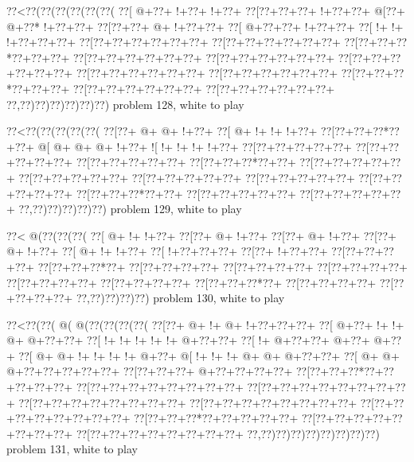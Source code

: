 \vbox{\vbox{\goo
\0??<\0??(\0??(\0??(\0??(\0??(\0??(
\0??[\- @+\0??+\- !+\0??+\- !+\0??+
\0??[\0??+\0??+\0??+\- !+\0??+\0??+
\- @[\0??+\- @+\0??*\- !+\0??+\0??+
\0??[\0??+\0??+\- @+\- !+\0??+\0??+
\0??[\- @+\0??+\0??+\- !+\0??+\0??+
\0??[\- !+\- !+\- !+\0??+\0??+\0??+
\0??[\0??+\0??+\0??+\0??+\0??+\0??+
\0??[\0??+\0??+\0??+\0??+\0??+\0??+
\0??[\0??+\0??+\0??*\0??+\0??+\0??+
\0??[\0??+\0??+\0??+\0??+\0??+\0??+
\0??[\0??+\0??+\0??+\0??+\0??+\0??+
\0??[\0??+\0??+\0??+\0??+\0??+\0??+
\0??[\0??+\0??+\0??+\0??+\0??+\0??+
\0??[\0??+\0??+\0??+\0??+\0??+\0??+
\0??[\0??+\0??+\0??*\0??+\0??+\0??+
\0??[\0??+\0??+\0??+\0??+\0??+\0??+
\0??[\0??+\0??+\0??+\0??+\0??+\0??+
\0??,\0??)\0??)\0??)\0??)\0??)\0??)
}
\hfil problem 128, white to play\hfil\break
}

\vbox{\vbox{\goo
\0??<\0??(\0??(\0??(\0??(\0??(
\0??[\0??+\- @+\- @+\- !+\0??+
\0??[\- @+\- !+\- !+\- !+\0??+
\0??[\0??+\0??+\0??*\0??+\0??+
\- @[\- @+\- @+\- @+\- !+\0??+
\- ![\- !+\- !+\- !+\- !+\0??+
\0??[\0??+\0??+\0??+\0??+\0??+
\0??[\0??+\0??+\0??+\0??+\0??+
\0??[\0??+\0??+\0??+\0??+\0??+
\0??[\0??+\0??+\0??*\0??+\0??+
\0??[\0??+\0??+\0??+\0??+\0??+
\0??[\0??+\0??+\0??+\0??+\0??+
\0??[\0??+\0??+\0??+\0??+\0??+
\0??[\0??+\0??+\0??+\0??+\0??+
\0??[\0??+\0??+\0??+\0??+\0??+
\0??[\0??+\0??+\0??*\0??+\0??+
\0??[\0??+\0??+\0??+\0??+\0??+
\0??[\0??+\0??+\0??+\0??+\0??+
\0??,\0??)\0??)\0??)\0??)\0??)
}
\hfil problem 129, white to play\hfil\break
}

\vbox{\vbox{\goo
\0??<\- @(\0??(\0??(\0??(
\0??[\- @+\- !+\- !+\0??+
\0??[\0??+\- @+\- !+\0??+
\0??[\0??+\- @+\- !+\0??+
\0??[\0??+\- @+\- !+\0??+
\0??[\- @+\- !+\- !+\0??+
\0??[\- !+\0??+\0??+\0??+
\0??[\0??+\- !+\0??+\0??+
\0??[\0??+\0??+\0??+\0??+
\0??[\0??+\0??+\0??*\0??+
\0??[\0??+\0??+\0??+\0??+
\0??[\0??+\0??+\0??+\0??+
\0??[\0??+\0??+\0??+\0??+
\0??[\0??+\0??+\0??+\0??+
\0??[\0??+\0??+\0??+\0??+
\0??[\0??+\0??+\0??*\0??+
\0??[\0??+\0??+\0??+\0??+
\0??[\0??+\0??+\0??+\0??+
\0??,\0??)\0??)\0??)\0??)
}
\hfil problem 130, white to play\hfil\break
}

\vbox{\vbox{\goo
\0??<\0??(\0??(\- @(\- @(\0??(\0??(\0??(\0??(
\0??[\0??+\- @+\- !+\- @+\- !+\0??+\0??+\0??+
\0??[\- @+\0??+\- !+\- !+\- @+\- @+\0??+\0??+
\0??[\- !+\- !+\- !+\- !+\- !+\- @+\0??+\0??+
\0??[\- !+\- @+\0??+\0??+\- @+\0??+\- @+\0??+
\0??[\- @+\- @+\- !+\- !+\- !+\- !+\- @+\0??+
\- @[\- !+\- !+\- !+\- @+\- @+\- @+\0??+\0??+
\0??[\- @+\- @+\- @+\0??+\0??+\0??+\0??+\0??+
\0??[\0??+\0??+\0??+\- @+\0??+\0??+\0??+\0??+
\0??[\0??+\0??+\0??*\0??+\0??+\0??+\0??+\0??+
\0??[\0??+\0??+\0??+\0??+\0??+\0??+\0??+\0??+
\0??[\0??+\0??+\0??+\0??+\0??+\0??+\0??+\0??+
\0??[\0??+\0??+\0??+\0??+\0??+\0??+\0??+\0??+
\0??[\0??+\0??+\0??+\0??+\0??+\0??+\0??+\0??+
\0??[\0??+\0??+\0??+\0??+\0??+\0??+\0??+\0??+
\0??[\0??+\0??+\0??*\0??+\0??+\0??+\0??+\0??+
\0??[\0??+\0??+\0??+\0??+\0??+\0??+\0??+\0??+
\0??[\0??+\0??+\0??+\0??+\0??+\0??+\0??+\0??+
\0??,\0??)\0??)\0??)\0??)\0??)\0??)\0??)\0??)
}
\hfil problem 131, white to play\hfil\break
}

